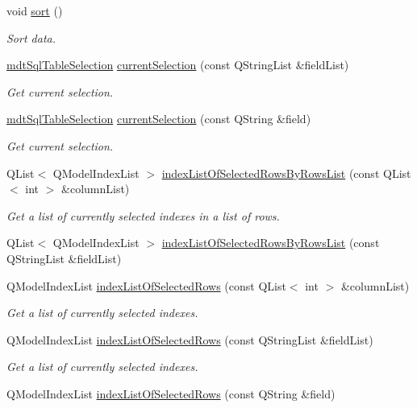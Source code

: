 \begin{DoxyCompactItemize}
void \hyperlink{classmdt_sql_table_widget_a5e1323816fce33680857048db8cbb255}{sort} ()
\begin{DoxyCompactList}\small\item\em Sort data. \end{DoxyCompactList}\item 
\hyperlink{classmdt_sql_table_selection}{mdt\-Sql\-Table\-Selection} \hyperlink{classmdt_sql_table_widget_a65f1bb0ebf82f73ef4a61e53ec4a26a7}{current\-Selection} (const Q\-String\-List \&field\-List)
\begin{DoxyCompactList}\small\item\em Get current selection. \end{DoxyCompactList}\item 
\hyperlink{classmdt_sql_table_selection}{mdt\-Sql\-Table\-Selection} \hyperlink{classmdt_sql_table_widget_adb4792d2ed64a9cce61bc429986ae9a1}{current\-Selection} (const Q\-String \&field)
\begin{DoxyCompactList}\small\item\em Get current selection. \end{DoxyCompactList}\item 
Q\-List$<$ Q\-Model\-Index\-List $>$ \hyperlink{classmdt_sql_table_widget_af28a5a54efb31c29734fb5b2d7f0e2fa}{index\-List\-Of\-Selected\-Rows\-By\-Rows\-List} (const Q\-List$<$ int $>$ \&column\-List)
\begin{DoxyCompactList}\small\item\em Get a list of currently selected indexes in a list of rows. \end{DoxyCompactList}\item 
Q\-List$<$ Q\-Model\-Index\-List $>$ \hyperlink{classmdt_sql_table_widget_a5abe02dacc9fd8c0c33c27dbc5216d1b}{index\-List\-Of\-Selected\-Rows\-By\-Rows\-List} (const Q\-String\-List \&field\-List)
\item 
Q\-Model\-Index\-List \hyperlink{classmdt_sql_table_widget_a9a43d9a5d2e63189f17d2bce7159e510}{index\-List\-Of\-Selected\-Rows} (const Q\-List$<$ int $>$ \&column\-List)
\begin{DoxyCompactList}\small\item\em Get a list of currently selected indexes. \end{DoxyCompactList}\item 
Q\-Model\-Index\-List \hyperlink{classmdt_sql_table_widget_abe241fe0b24552b5403cb15593e18cdd}{index\-List\-Of\-Selected\-Rows} (const Q\-String\-List \&field\-List)
\begin{DoxyCompactList}\small\item\em Get a list of currently selected indexes. \end{DoxyCompactList}\item 
Q\-Model\-Index\-List \hyperlink{classmdt_sql_table_widget_a9616d390c25a3b1e863e855e00172e42}{index\-List\-Of\-Selected\-Rows} (const Q\-String \&field)
\end{DoxyCompactItemize}
